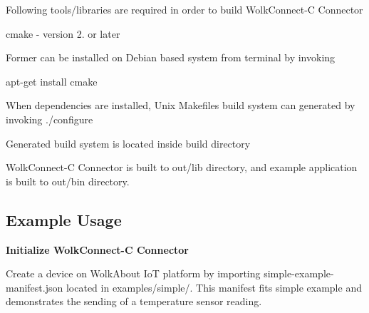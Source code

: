 Following tools/libraries are required in order to build Wolk\+Connect-\/C Connector


\begin{DoxyItemize}
\item cmake -\/ version 2. or later
\end{DoxyItemize}

Former can be installed on Debian based system from terminal by invoking

{\ttfamily apt-\/get install cmake}

When dependencies are installed, Unix Makefiles build system can generated by invoking {\ttfamily ./configure}

Generated build system is located inside \textquotesingle{}build\textquotesingle{} directory

Wolk\+Connect-\/C Connector is built to {\ttfamily out/lib} directory, and example application is built to {\ttfamily out/bin} directory.

\subsection*{Example Usage }

{\bfseries Initialize Wolk\+Connect-\/C Connector}

Create a device on Wolk\+About IoT platform by importing {\ttfamily simple-\/example-\/manifest.\+json} located in {\ttfamily examples/simple/}. This manifest fits {\ttfamily simple} example and demonstrates the sending of a temperature sensor reading.


